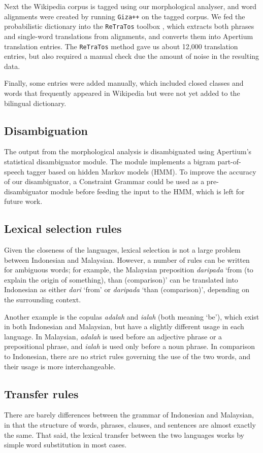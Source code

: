 \documentclass[10pt,a5paper,twoside]{article}
\begin{document}
Next the Wikipedia corpus is tagged using our morphological analyser, and word alignments were created by running \texttt{Giza++} \citep{Och2003align} on the tagged corpus. We fed the probabilistic dictionary into the \texttt{ReTraTos} toolbox \citep{Caseli2006retratos}, which extracts both phrases and single-word translations from alignments, and converts them into Apertium translation entries. The \texttt{ReTraTos} method gave us about 12,000 translation entries, but also required a manual check due the amount of noise in the resulting data.

Finally, some entries were added manually, which included closed classes and words that frequently appeared in Wikipedia but were not yet added to the bilingual dictionary.

\subsection{Disambiguation}
The output from the morphological analysis is disambiguated using Apertium's statistical disambiguator module. The module implements a bigram part-of-speech tagger based on hidden Markov models (HMM). To improve the accuracy of our disambiguator, a Constraint Grammar \citep{Karlsson1990cg} could be used as a pre-disambiguator module before feeding the input to the HMM, which is left for future work.

\subsection{Lexical selection rules}
Given the closeness of the languages, lexical selection is not a large problem between Indonesian and Malaysian. However, a number of rules can be written for ambiguous words; for example, the Malaysian preposition \emph{daripada} `from (to explain the origin of something), than (comparison)' can be translated into Indonesian as either \emph{dari} `from' or \emph{daripada} `than (comparison)', depending on the surrounding context.

Another example is the copulas \emph{adalah} and \emph{ialah} (both meaning `be'), which exist in both Indonesian and Malaysian, but have a slightly different usage in each language. In Malaysian, \emph{adalah} is used before an adjective phrase or a prepositional phrase, and \emph{ialah} is used only before a noun phrase. In comparison to Indonesian, there are no strict rules governing the use of the two words, and their usage is more interchangeable.
\subsection{Transfer rules}
There are barely differences between the grammar of Indonesian and Malaysian, in that the structure of words, phrases, clauses, and sentences are almost exactly the same. That said, the lexical transfer between the two languages works by simple word substitution in most cases.
\end{document}
